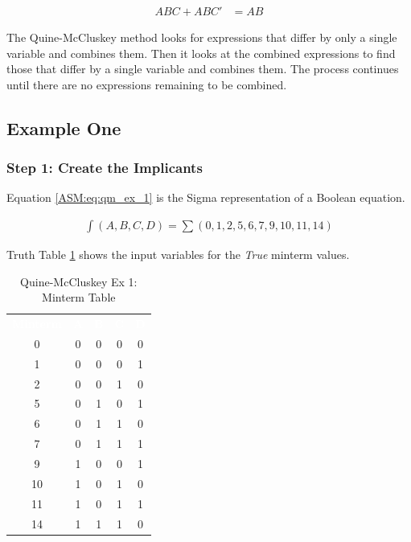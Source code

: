\begin{align}
	\label{ASM:eq:quine-mccluskey_combining_complements}
	ABC+ABC' &= AB 
\end{align}

The Quine-McCluskey method looks for expressions that differ by only a single variable and combines them. Then it looks at the combined expressions to find those that differ by a single variable and combines them. The process continues until there are no expressions remaining to be combined.

\subsection{Example One}
\label{ASM:subsec:quine-mccluskey_ex_1}

\subsubsection{Step 1: Create the Implicants}
\label{ASM:subsubsec:quine-mccluskey_ex_1_step_1}

Equation \ref{ASM:eq:qm_ex_1} is the Sigma representation of a Boolean equation.

\begin{align}
	\label{ASM:eq:qm_ex_1}
	\int(A,B,C,D)=\sum(0,1,2,5,6,7,9,10,11,14) 
\end{align}

Truth Table \ref{ASM:tab:qm_ex_1_minterm_table} shows the input variables for the \emph{True} minterm values.

\begin{table}[H]
	\sffamily
	\newcommand{\head}[1]{\textcolor{white}{\textbf{#1}}}		
	\begin{center}
		\begin{tabular}{ccccc} 
			\rowcolor{black!75}
			\head{Minterm} & \head{A} & \head{B} & \head{C} & \head{D} \\
			0 & 0 & 0 & 0 & 0 \\
			1 & 0 & 0 & 0 & 1 \\
			2 & 0 & 0 & 1 & 0 \\
			5 & 0 & 1 & 0 & 1 \\
			6 & 0 & 1 & 1 & 0 \\
			7 & 0 & 1 & 1 & 1 \\
			9 & 1 & 0 & 0 & 1 \\
			10 & 1 & 0 & 1 & 0 \\
			11 & 1 & 0 & 1 & 1 \\
			14 & 1 & 1 & 1 & 0 
		\end{tabular}
	\end{center}
	\caption{Quine-McCluskey Ex 1: Minterm Table}
  \label{ASM:tab:qm_ex_1_minterm_table}
\end{table}

